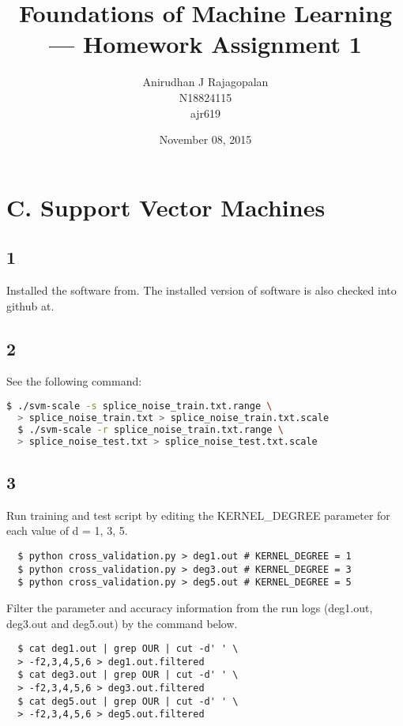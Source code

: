 \documentclass{article}
\begin{document}
\title{Foundations of Machine Learning --- Homework Assignment 1}
\date{November 08, 2015}
\author{Anirudhan J Rajagopalan\\ N18824115\\ ajr619}

\maketitle

\newpage

\section*{C. Support Vector Machines}
\subsection*{1}
Installed the software from\cite{libsvm}.  The installed version of software is also checked into github at\cite{githuburl}. 
\subsection*{2}

\noindent See the following command:
\begin{lstlisting}[language=bash]
  $ ./svm-scale -s splice_noise_train.txt.range \ 
  > splice_noise_train.txt > splice_noise_train.txt.scale
  $ ./svm-scale -r splice_noise_train.txt.range \
  > splice_noise_test.txt > splice_noise_test.txt.scale
\end{lstlisting}

\subsection*{3}
Run training and test script\cite{cvscript} by editing the KERNEL\_DEGREE parameter for each value of d = 1, 3, 5.
\begin{lstlisting}
  $ python cross_validation.py > deg1.out # KERNEL_DEGREE = 1
  $ python cross_validation.py > deg3.out # KERNEL_DEGREE = 3
  $ python cross_validation.py > deg5.out # KERNEL_DEGREE = 5
\end{lstlisting}

Filter the parameter and accuracy information from the run logs (deg1.out, deg3.out and deg5.out) by the command below.
\begin{lstlisting}
  $ cat deg1.out | grep OUR | cut -d' ' \
  > -f2,3,4,5,6 > deg1.out.filtered
  $ cat deg3.out | grep OUR | cut -d' ' \
  > -f2,3,4,5,6 > deg3.out.filtered
  $ cat deg5.out | grep OUR | cut -d' ' \
  > -f2,3,4,5,6 > deg5.out.filtered
\end{lstlisting}
\end{document}
